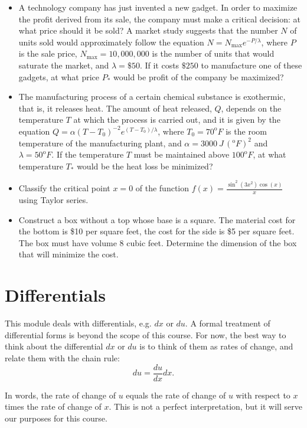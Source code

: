\documentclass[twoside,openright,titlepage,a4paper]{book}
\begin{document}
\begin{sloppypar}
\begin{itemize}
\item A technology company has just invented a new gadget. In order to maximize the profit derived from its sale, the company must make a critical decision: at what price should it be sold? A market study suggests that the number $N$ of units sold would approximately follow the equation $N = N_\mathrm{max} e^{-P / \lambda} $, where $P$ is the sale price, $N_\mathrm{max} = 10,000,000$ is the number of units that would saturate the market, and $\lambda = \$50$. If it costs $\$250$ to manufacture one of these gadgets, at what price $P_\ast$ would be profit of the company be maximized?
\item The manufacturing process of a certain chemical substance is exothermic, that is, it releases heat. The amount of heat released, $Q$, depends on the temperature $T$ at which the process is carried out, and it is given by the equation $ Q = \alpha (T-T_0)^{-2} e^{(T-T_0) / \lambda} $, where $T_0 = 70^\mathrm{o}F$ is the room temperature of the manufacturing plant, and $\displaystyle \alpha = 3000\: J\, ({}^\mathrm{o}F)^2$ and $\lambda = 50^\mathrm{o} F$. If the temperature $T$ must be maintained above $100^\mathrm{o} F$, at what temperature $T_\ast$ would be the heat loss be minimized?
\item Classify the critical point $x=0$ of the function $f(x) = \frac{\sin^2(3x^2) \cos(x)}{x} $ using Taylor series.
\item Construct a box without a top whose base is a square. The material cost for the bottom is \$10 per square feet, the cost for the side is \$5 per square feet. The box must have volume 8 cubic feet. Determine the dimension of the box that will minimize the cost.
\end{itemize}

\section{Differentials} \label{ChDifferentiationSecDifferentials}

This module deals with differentials, e.g. $dx$ or $du$. A formal treatment of differential forms is beyond the scope of this course. For now, the best way to think about the differential $dx$ or $du$ is to think of them as rates of change, and relate them with the chain rule:
\begin{equation*}
du = \frac{du}{dx}dx.
\end{equation*}

In words, the rate of change of $u$ equals the rate of change of $u$ with respect to $x$ times the rate of change of $x$. This is not a perfect interpretation, but it will serve our purposes for this course.


\end{sloppypar}
\end{document}
